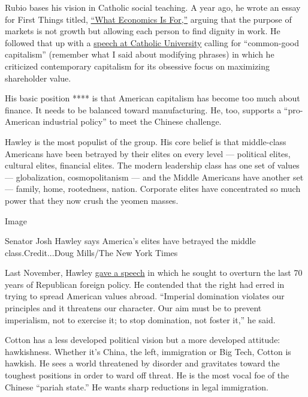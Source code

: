 Rubio bases his vision in Catholic social teaching. A year ago, he wrote
an essay for First Things titled,
\href{https://www.firstthings.com/web-exclusives/2019/08/what-economics-is-for}{``What
Economics Is For,''} arguing that the purpose of markets is not growth
but allowing each person to find dignity in work. He followed that up
with a
\href{https://www.rubio.senate.gov/public/_cache/files/6d09ae19-8df3-4755-b301-795154a68c59/C58480B07D02452574C5DB8D603803EF.final---cua-speech-11.5.19.pdf}{speech
at Catholic University} calling for ``common-good capitalism'' (remember
what I said about modifying phrases) in which he criticized contemporary
capitalism for its obsessive focus on maximizing shareholder value.

His basic position **** is that American capitalism has become too much
about finance. It needs to be balanced toward manufacturing. He, too,
supports a ``pro-American industrial policy'' to meet the Chinese
challenge.

Hawley is the most populist of the group. His core belief is that
middle-class Americans have been betrayed by their elites on every level
--- political elites, cultural elites, financial elites. The modern
leadership class has one set of values --- globalization,
cosmopolitanism --- and the Middle Americans have another set ---
family, home, rootedness, nation. Corporate elites have concentrated so
much power that they now crush the yeomen masses.

Image

Senator Josh Hawley says America's elites have betrayed the middle
class.Credit...Doug Mills/The New York Times

Last November, Hawley
\href{https://www.hawley.senate.gov/senator-hawleys-speech-rethinking-americas-foreign-policy-consensus}{gave
a speech} in which he sought to overturn the last 70 years of Republican
foreign policy. He contended that the right had erred in trying to
spread American values abroad. ``Imperial domination violates our
principles and it threatens our character. Our aim must be to prevent
imperialism, not to exercise it; to stop domination, not foster it,'' he
said.

Cotton has a less developed political vision but a more developed
attitude: hawkishness. Whether it's China, the left, immigration or Big
Tech, Cotton is hawkish. He sees a world threatened by disorder and
gravitates toward the toughest positions in order to ward off threat. He
is the most vocal foe of the Chinese ``pariah state.'' He wants sharp
reductions in legal immigration.

